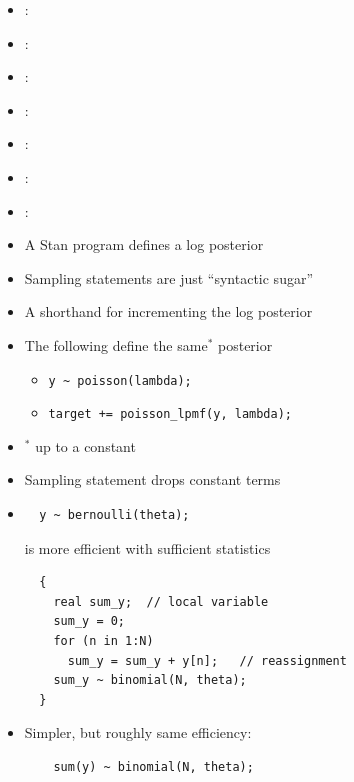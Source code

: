 \documentclass[10pt]{report}
\begin{document}
%
\begin{itemize}
\item {}: \ {\footnotesize {}}
\item {}: \ {\footnotesize {}}
\item {}: \ {\footnotesize
    }
\item {}: \ {\footnotesize {}}
\item {}: \ {\footnotesize {}}
\end{itemize}

%
\begin{itemize}
\item {}: \ {\footnotesize {}}
\item {}:
\ {\footnotesize
    }
\end{itemize}


%
\begin{itemize}
\item A Stan program defines a log posterior
\item Sampling statements are just ``syntactic sugar''
\item A shorthand for incrementing the log posterior
\item The following define the same$^*$ posterior
\begin{itemize}
\item \Verb|y ~ poisson(lambda);|
\item \Verb|target += poisson_lpmf(y, lambda);|
\end{itemize}
\item ${}^{*}$ up to a constant
\item Sampling statement drops constant terms
\end{itemize}



%
\begin{itemize}
\item
\begin{Verbatim}
  y ~ bernoulli(theta);
\end{Verbatim}
is more efficient with sufficient statistics
{\small
\begin{Verbatim}
  {
    real sum_y;  // local variable
    sum_y = 0;
    for (n in 1:N)
      sum_y = sum_y + y[n];   // reassignment
    sum_y ~ binomial(N, theta);
  }
\end{Verbatim}
}
\item Simpler, but roughly same efficiency:
\begin{Verbatim}
    sum(y) ~ binomial(N, theta);
\end{Verbatim}
\end{itemize}
\end{document}
